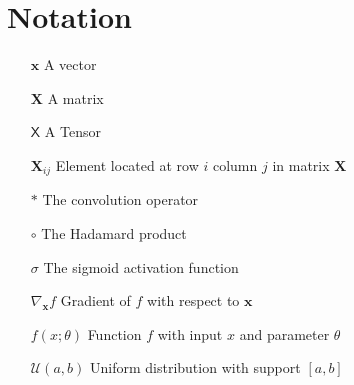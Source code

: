 \documentclass[./main.tex]{subfiles}
\begin{document}
\section*{Notation}
\begin{itemize}[leftmargin=2.0cm,labelsep=0.5cm]
    \item[$\bm{x}$] A vector
    \item[$\bm{X}$] A matrix
    \item[$\mathsf{X}$] A Tensor 
    \item[$\bm{X}_{ij}$] Element located at row $i$ column $j$ in matrix $\bm{X}$
    \item[$*$] The convolution operator
    \item[$\circ$] The Hadamard product  
    \item[$\sigma$] The sigmoid activation function 
    \item[$\nabla_{\bm{x}} f$] Gradient of $f$ with respect to $\bm{x}$
    \item[$f(x; \theta)$] Function $f$ with input $x$ and parameter $\theta$
    \item[$\mathcal{U}(a, b)$] Uniform distribution with support $[a, b]$
\end{itemize}
\end{document}
